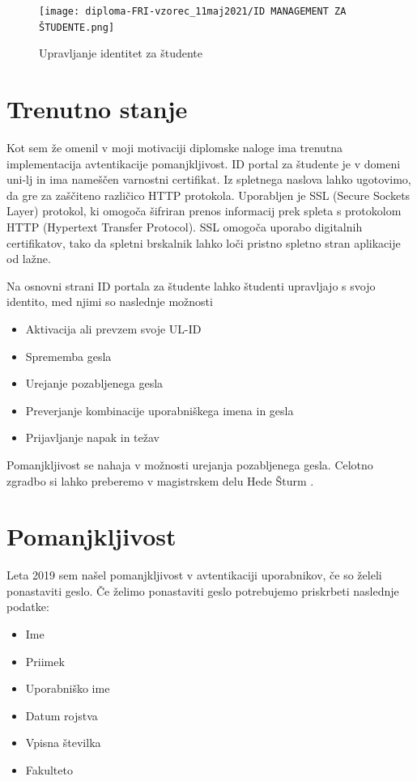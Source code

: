 \documentclass[a4paper,12pt,openright]{book}
\begin{document}
\begin{figure}[H]
\texttt{[image: diploma-FRI-vzorec\_11maj2021/ID MANAGEMENT ZA ŠTUDENTE.png]}
\caption{Upravljanje identitet za študente}
\label{fig:student}
\end{figure}



\section{Trenutno stanje}

Kot sem že omenil v moji motivaciji diplomske naloge ima trenutna implementacija avtentikacije pomanjkljivost. 
\newline 
ID portal za študente je v domeni uni-lj in ima nameščen varnostni certifikat. Iz spletnega naslova lahko ugotovimo, da gre za zaščiteno različico HTTP protokola. Uporabljen je SSL (Secure Sockets Layer) protokol, ki omogoča šifriran prenos informacij prek spleta s protokolom HTTP (Hypertext Transfer Protocol). SSL omogoča uporabo digitalnih certifikatov, tako da spletni brskalnik lahko loči pristno spletno stran aplikacije od lažne. 

Na osnovni strani ID portala za študente lahko študenti upravljajo s svojo identito, med njimi so naslednje možnosti

\begin{itemize}
    \item Aktivacija ali prevzem svoje UL-ID
    \item Sprememba gesla
    \item Urejanje pozabljenega gesla
    \item Preverjanje kombinacije uporabniškega imena in gesla
    \item Prijavljanje napak in težav
\end{itemize}

Pomanjkljivost se nahaja v možnosti urejanja pozabljenega gesla. Celotno zgradbo si lahko preberemo v magistrskem delu Hede Šturm \cite{magistrska}.

\section{Pomanjkljivost}
Leta 2019 sem našel pomanjkljivost v avtentikaciji uporabnikov, če so želeli ponastaviti geslo. Če želimo ponastaviti geslo potrebujemo priskrbeti naslednje podatke:
\begin{itemize}
    \item Ime
    \item Priimek
    \item Uporabniško ime
    \item Datum rojstva
    \item Vpisna številka
    \item Fakulteto
\end{itemize}
\end{document}
